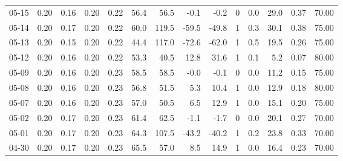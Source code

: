 \begin{threeparttable}
{\begin{tabular}{lrrrrrrrrrrrrr}
  05-15 &          0.20 &          0.16 &          0.20 &        0.22 &                56.4 &                56.5 &       -0.1 &         -0.2 &              0 &                 0.0 &             29.0 &            0.37 &                  70.00 \\
  05-14 &          0.20 &          0.17 &          0.20 &        0.22 &                60.0 &               119.5 &      -59.5 &        -49.8 &              1 &                 0.3 &             30.1 &            0.38 &                  75.00 \\
  05-13 &          0.20 &          0.15 &          0.20 &        0.22 &                44.4 &               117.0 &      -72.6 &        -62.0 &              1 &                 0.5 &             19.5 &            0.26 &                  75.00 \\
  05-12 &          0.20 &          0.16 &          0.20 &        0.22 &                53.3 &                40.5 &       12.8 &         31.6 &              1 &                 0.1 &              5.2 &            0.07 &                  80.00 \\
  05-09 &          0.20 &          0.16 &          0.20 &        0.23 &                58.5 &                58.5 &       -0.0 &         -0.1 &              0 &                 0.0 &             11.2 &            0.15 &                  75.00 \\
  05-08 &          0.20 &          0.16 &          0.20 &        0.23 &                56.8 &                51.5 &        5.3 &         10.4 &              1 &                 0.0 &             12.9 &            0.18 &                  80.00 \\
  05-07 &          0.20 &          0.16 &          0.20 &        0.23 &                57.0 &                50.5 &        6.5 &         12.9 &              1 &                 0.0 &             15.1 &            0.20 &                  75.00 \\
  05-02 &          0.20 &          0.17 &          0.20 &        0.23 &                61.4 &                62.5 &       -1.1 &         -1.7 &              0 &                 0.0 &             20.1 &            0.27 &                  70.00 \\
  05-01 &          0.20 &          0.17 &          0.20 &        0.23 &                64.3 &               107.5 &      -43.2 &        -40.2 &              1 &                 0.2 &             23.8 &            0.33 &                  70.00 \\
  04-30 &          0.20 &          0.17 &          0.20 &        0.23 &                65.5 &                57.0 &        8.5 &         14.9 &              1 &                 0.0 &             16.4 &            0.23 &                  70.00 \\

\end{tabular}}
\end{threeparttable}
